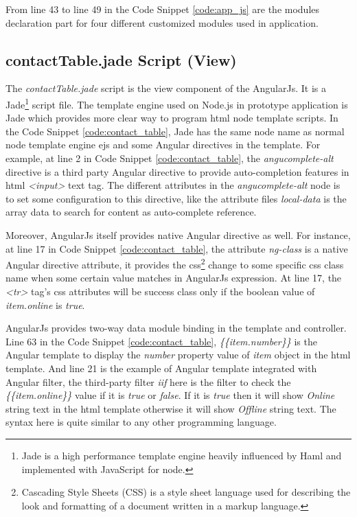 \par From line 43 to line 49 in the Code Snippet \ref{code:app_js} are the modules declaration part for four different customized modules used in application. 

\subsection{contactTable.jade Script (View)}

\par The \textit{contactTable.jade} script is the view component of the AngularJs. It is a Jade\footnote{Jade is a high performance template engine heavily influenced by Haml and implemented with JavaScript for node.\cite{github:jade}} script file. The template engine used on Node.js in prototype application is Jade which provides more clear way to program \gls{html} node template scripts. In the Code Snippet \ref{code:contact_table}, Jade has the same node name as normal node template engine \gls{ejs} and some Angular directives in the template. For example, at line 2 in Code Snippet \ref{code:contact_table}, the \textit{angucomplete-alt} directive is a third party Angular directive to provide auto-completion features in \gls{html} \textit{<input>} text tag. The different attributes in the \textit{angucomplete-alt} node is to set some configuration to this directive, like the attribute files \textit{local-data} is the array data to search for content as auto-complete reference.

\par Moreover, AngularJs itself provides native Angular directive as well. For instance, at line 17 in Code Snippet \ref{code:contact_table}, the attribute \textit{ng-class} is a native Angular directive attribute, it provides the \gls{css}\footnote{Cascading Style Sheets (CSS) is a style sheet language used for describing the look and formatting of a document written in a markup language.\cite{wiki:css}} change to some specific \gls{css} class name when some certain value matches in AngularJs expression. At line 17, the \textit{<tr>} tag's \gls{css} attributes will be success class only if the boolean value of \textit{item.online} is \textit{true}.

\par AngularJs provides two-way data module binding in the template and controller. Line 63 in the Code Snippet \ref{code:contact_table}, \textit{\{\{item.number\}\}} is the Angular template to display the \textit{number} property value of \textit{item} object in the \gls{html} template. And line 21 is the example of Angular template integrated with Angular filter, the third-party filter \textit{iif} here is the filter to check the \textit{\{\{item.online\}\}} value if it is \textit{true} or \textit{false}. If it is \textit{true} then it will show \textit{Online} string text in the \gls{html} template otherwise it will show \textit{Offline} string text. The syntax here is quite similar to any other programming language.

